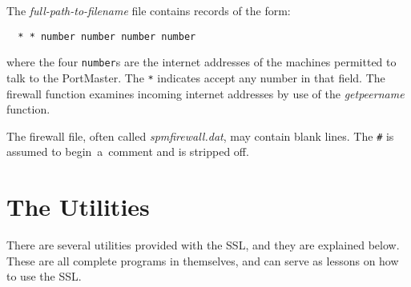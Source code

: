 \documentclass[12pt]{article}
\def\SSL{{\small SSL}}
\begin{document}
The {\em full-path-to-filename} file contains records of the form:
\begin{verbatim}
  * * number number number number
\end{verbatim}

where the four \verb`number`s are the internet addresses of the machines
permitted to talk to the PortMaster.  The \verb`*` indicates accept any number
in that field.  The firewall function examines incoming internet addresses by
use of the {\em getpeername} function.

The firewall file, often called {\em spmfirewall.dat}, may contain blank
lines.  The \verb`#` is assumed to begin~a~comment and is stripped off.


\newpage
\section{The Utilities}

There are several utilities provided with the \SSL, and they are explained
below.  These are all complete programs in themselves, and can serve as
lessons on how to use the \SSL.
\end{document}
